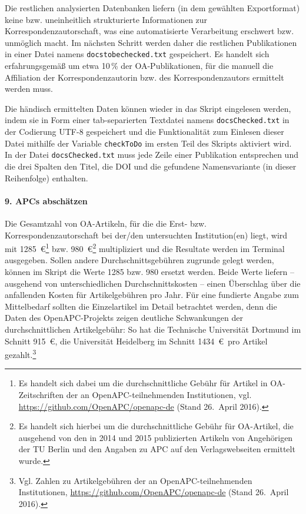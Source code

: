 Die restlichen analysierten Datenbanken liefern (in dem gewählten Exportformat) keine bzw. uneinheitlich strukturierte Informationen zur Korrespondenzautorschaft, was eine automatisierte Verarbeitung erschwert bzw. unmöglich macht. Im nächsten Schritt werden daher die restlichen Publikationen in einer Datei namens \texttt{docstobechecked.txt} gespeichert. Es handelt sich erfahrungsgemäß um etwa 10\,\% der OA-Publikationen, für die manuell die Affiliation der Korrespondenzautorin bzw. des Korrespondenzautors ermittelt werden muss.

Die händisch ermittelten Daten können wieder in das Skript eingelesen werden, indem sie in Form einer tab-separierten Textdatei namens \texttt{docsChecked.txt} in der Codierung UTF-8 gespeichert und die Funktionalität zum Einlesen dieser Datei mithilfe der Variable \texttt{checkToDo} im ersten Teil des Skripts aktiviert wird. In der Datei \texttt{docsChecked.txt} muss jede Zeile einer Publikation entsprechen und die drei Spalten den Titel, die DOI und die gefundene Namensvariante (in dieser Reihenfolge) enthalten.

\paragraph{9. APCs abschätzen}
Die Gesamtzahl von OA-Artikeln, für die die Erst- bzw. Korrespondenzautorschaft bei der/den untersuchten Institution(en) liegt,  wird mit 1285~\euro\footnote{Es handelt sich dabei um die durchschnittliche Gebühr für Artikel in OA-Zeitschriften der an OpenAPC-teilnehmenden Institutionen, vgl. \url{https://github.com/OpenAPC/openapc-de} (Stand 26.~April 2016).} bzw. 980~\euro\footnote{Es handelt sich hierbei um die durchschnittliche Gebühr für OA-Artikel, die ausgehend von den in 2014 und 2015 publizierten Artikeln von Angehörigen der TU Berlin und den Angaben zu APC auf den Verlagswebseiten ermittelt wurde.} multipliziert und die Resultate werden im Terminal ausgegeben. Sollen andere Durchschnittsgebühren zugrunde gelegt werden, können im Skript die Werte 1285 bzw. 980 ersetzt werden. Beide Werte liefern -- ausgehend von unterschiedlichen Durchschnittskosten -- einen Überschlag über die anfallenden Kosten für Artikelgebühren pro Jahr. Für eine fundierte Angabe zum Mittelbedarf sollten die Einzelartikel im Detail betrachtet werden, denn die Daten des OpenAPC-Projekts zeigen deutliche Schwankungen der durchschnittlichen Artikelgebühr: So hat die Technische Universität Dortmund im Schnitt 915~\euro, die Universität Heidelberg im Schnitt 1434~\euro\ pro Artikel gezahlt.\footnote{Vgl. Zahlen zu Artikelgebühren der an OpenAPC-teilnehmenden Institutionen, \url{https://github.com/OpenAPC/openapc-de} (Stand 26.~April 2016).}

